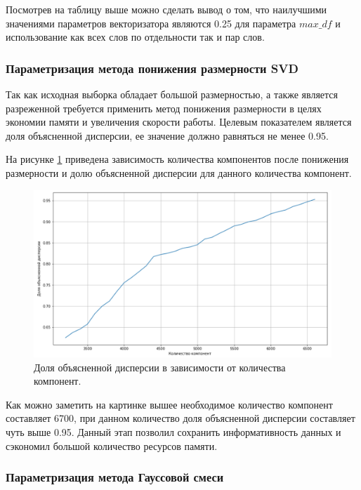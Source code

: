 Посмотрев на таблицу выше можно сделать вывод о том, что наилучшими значениями параметров векторизатора являются 0.25 для параметра $max\_df$ и использование как всех слов по отдельности так и пар слов.

\subsubsection{Параметризация метода понижения размерности SVD}

Так как исходная выборка обладает большой размерностью, а также является разреженной требуется применить метод понижения размерности в целях экономии памяти и увеличения скорости работы. Целевым показателем является доля объясненной дисперсии, ее значение должно равняться не менее 0.95.

На рисунке \ref{ExpVariance} приведена зависимость количества компонентов после понижения размерности и долю объясненной дисперсии для данного количества компонент.

\begin{figure}[H]
	\centering
	\includegraphics[width=\textwidth]{img/ExpVariance.pdf}
	\caption{Доля объясненной дисперсии в зависимости от количества компонент.}
	\label{ExpVariance}
\end{figure}  

Как можно заметить на картинке вышее необходимое количество компонент составляет 6700, при данном количество доля объясненной дисперсии составляет чуть выше 0.95. Данный этап позволил сохранить информативность данных и сэкономил большой количество ресурсов памяти.

\subsubsection{Параметризация метода Гауссовой смеси}

